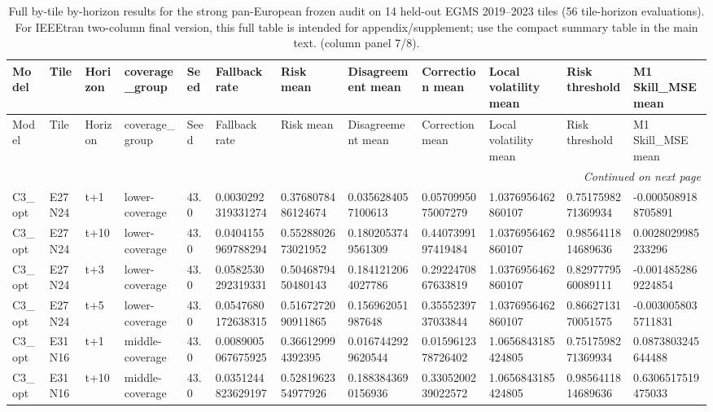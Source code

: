 \begin{landscape}
\scriptsize
\setlength{\LTleft}{0pt}
\setlength{\LTright}{0pt}
\begin{longtable}{llllllllllll}
\caption{Full by-tile by-horizon results for the strong pan-European frozen audit on 14 held-out EGMS 2019--2023 tiles (56 tile-horizon evaluations). For IEEEtran two-column final version, this full table is intended for appendix/supplement; use the compact summary table in the main text. (column panel 7/8).}\label{tab:e7_strong_by_tile_full_part7}\\
\toprule
Model & Tile & Horizon & coverage\_group & Seed & Fallback rate & Risk mean & Disagreement mean & Correction mean & Local volatility mean & Risk threshold & M1 Skill\_MSE mean \\
\midrule
\endfirsthead
\toprule
Model & Tile & Horizon & coverage\_group & Seed & Fallback rate & Risk mean & Disagreement mean & Correction mean & Local volatility mean & Risk threshold & M1 Skill\_MSE mean \\
\midrule
\endhead
\midrule
\multicolumn{12}{r}{\textit{Continued on next page}} \\
\endfoot
\bottomrule
\endlastfoot
C3\_opt & E27N24 & t+1 & lower-coverage & 43.0 & 0.0030292319331274 & 0.3768078486124674 & 0.0356284057100613 & 0.0570995075007279 & 1.0376956462860107 & 0.7517598271369934 & -0.0005089188705891 \\
C3\_opt & E27N24 & t+10 & lower-coverage & 43.0 & 0.0404155969788294 & 0.5528802673021952 & 0.1802053749561309 & 0.4407399197419484 & 1.0376956462860107 & 0.9856411814689636 & 0.0028029985233296 \\
C3\_opt & E27N24 & t+3 & lower-coverage & 43.0 & 0.0582530292319331 & 0.5046879450480143 & 0.1841212064027786 & 0.2922470867633819 & 1.0376956462860107 & 0.8297779560089111 & -0.0014852869224854 \\
C3\_opt & E27N24 & t+5 & lower-coverage & 43.0 & 0.0547680172638315 & 0.5167272090911865 & 0.156962051987648 & 0.3555239737033844 & 1.0376956462860107 & 0.8662713170051575 & -0.0030058035711831 \\
C3\_opt & E31N16 & t+1 & middle-coverage & 43.0 & 0.0089005067675925 & 0.366129994392395 & 0.0167442929620544 & 0.0159612378726402 & 1.0656843185424805 & 0.7517598271369934 & 0.0873803245644488 \\
C3\_opt & E31N16 & t+10 & middle-coverage & 43.0 & 0.0351244823629197 & 0.5281962354977926 & 0.1883843690156936 & 0.3305200239022572 & 1.0656843185424805 & 0.9856411814689636 & 0.6306517519475033 \\

\end{longtable}
\end{landscape}
